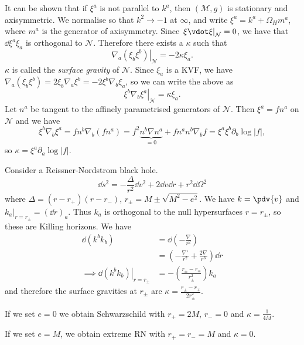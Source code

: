 \documentclass{jknotes}
\begin{document}
It can be shown that if \(\xi^a\) is not parallel to \(k^a\), then \((\mathcal{M},g)\) is stationary and axisymmetric. We normalise so that \(k^2\to-1\) at \(\infty\), and write \(\xi^a = k^a + \Omega_H m^a\), where \(m^a\) is the generator of axisymmetry. Since \(\left.\xi\vdot\xi\right|_{\mathcal{N}} = 0\), we have that \(\dd{\xi^a\xi_a}\) is orthogonal to \(\mathcal{N}\). Therefore there exists a \(\kappa\) such that
\begin{equation}
    \left.\nabla_a(\xi_b\xi^b)\right|_{\mathcal{N}} = -2\kappa\xi_a.
\end{equation}
\(\kappa\) is called the \emph{surface gravity} of \(\mathcal{N}\). Since \(\xi_a\) is a KVF, we have \(\nabla_a(\xi_b\xi^b) = 2\xi_b\nabla_a\xi^b = -2\xi^b\nabla_b\xi_a\), so we can write the above as
\begin{equation}
    \left.\xi^b\nabla_b\xi^a\right|_{\mathcal{N}} = \kappa\xi_a.
\end{equation}
Let \(n^a\) be tangent to the affinely parametrised generators of \(\mathcal{N}\). Then \(\xi^a = fn^a\) on \(\mathcal{N}\) and we have
\begin{equation}
    \xi^b\nabla_b\xi^a = fn^b\nabla_b(fn^a) = f^2\underbrace{n^b\nabla n^a}_{=0} + f n^a n^b\nabla_b f = \xi^a\xi^b\partial_b\log|f|,
\end{equation}
so \(\kappa = \xi^a\partial_a\log|f|\).
\begin{eg}
    Consider a Reissner-Nordstrom black hole.
    \begin{equation}
        \dd{s}^2 = -\frac{\Delta}{r^2} \dd{v}^2 + 2\dd{v}\dd{r} + r^2\dd{\Omega}^2
    \end{equation}
    where \(\Delta = (r-r_+)(r-r_-)\), \(r_\pm = M \pm \sqrt{M^2-e^2}\). We have \(k=\pdv{v}\) and \(\left.k_a\right|_{r=r_\pm}=(\dd{r})_a\). Thus \(k_a\) is orthogonal to the null hypersurfaces \(r=r_\pm\), so these are Killing horizons. We have
    \begin{align}
        \dd{(k^bk_b)} &= \dd{\left(-\frac{\nabla}{r^2}\right)} \\
                      &= \left(-\frac{\nabla'}{r^2} + \frac{2\nabla}{r^3}\right)\dd{r} \\
        \implies \left.\dd{(k^bk_b)}\right|_{r=r_\pm} &= - \left(\frac{r_\pm-r_\mp}{r_\pm^2}\right)k_a
    \end{align}
    and therefore the surface gravities at \(r_\pm\) are \(\kappa = \frac{r_\pm-r_\mp}{2r_\pm^2}\).
    
    If we set \(e=0\) we obtain Schwarzschild with \(r_+ = 2M\), \(r_- = 0\) and \(\kappa = \frac{1}{4M}\).

    If we set \(e=M\), we obtain extreme RN with \(r_+ = r_- = M\) and \(\kappa = 0\).
\end{eg}
\end{document}
